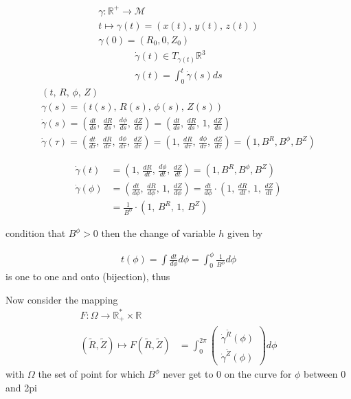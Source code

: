 \begin{align*}
    \gamma : \mathbb{R}^+\rightarrow\mathcal{M}\\
    t \mapsto \gamma(t) = (x(t),\,y(t),\,z(t))\\
    \gamma(0) = (R_0, 0, Z_0)
\end{align*}
\begin{align*}
    \dot{\gamma}(t) \in T_{\gamma(t)}\mathbb{R}^3 \\
    \gamma(t) = \int_0^t\dot{\gamma}(s)ds
\end{align*}
\begin{align*}
    (t,\,R,\,\phi,\,Z)\\
    \gamma(s) = (t(s),\,R(s),\,\phi(s),\,Z(s))\\
    \dot{\gamma}(s) = (\frac{dt}{ds},\,\frac{dR}{ds},\,\frac{d\phi}{ds},\,\frac{dZ}{ds}) = (\frac{dt}{ds},\,\frac{dR}{ds},\,1,\,\frac{dZ}{ds})\\
    \dot{\gamma}(\tau) = (\frac{dt}{d\tau},\,\frac{dR}{d\tau},\,\frac{d\phi}{d\tau},\,\frac{dZ}{d\tau}) = (1,\,\frac{dR}{d\tau},\,\frac{d\phi}{d\tau},\,\frac{dZ}{d\tau}) = (1, B^R, B^\phi, B^Z)
\end{align*}

\begin{align*}
    \dot{\gamma}(t) &= (1,\,\frac{dR}{dt},\,\frac{d\phi}{dt},\,\frac{dZ}{dt}) = (1, B^R, B^\phi, B^Z)\\
    \dot{\gamma}(\phi) &= (\frac{dt}{d\phi},\,\frac{dR}{d\phi},\,1,\,\frac{dZ}{d\phi}) = \frac{dt}{d\phi}\cdot(1,\,\frac{dR}{dt},\,1,\,\frac{dZ}{dt})\\
    &= \frac{1}{B^\phi}\cdot(1,\,B^R,\,1,\,B^Z)
\end{align*}

condition that $B^\phi > 0$  then the change of variable $h$ given by

\begin{align*}
    t(\phi) = \int \frac{dt}{d\phi}d\phi = \int_0^\phi \frac{1}{B^\phi}d\phi
\end{align*}
is one to one and onto (bijection), thus 

Now consider the mapping 
\begin{align*}
    F : \Omega \rightarrow \mathbb{R}_+^*\times\mathbb{R}\\
    (\tilde{R},\tilde{Z}) \mapsto F(\tilde{R},\tilde{Z}) &= \int_0^{2\pi}\begin{pmatrix}
        \dot{\gamma}^{\tilde{R}}(\phi)\\
        \dot{\gamma}^{\tilde{Z}}(\phi)
    \end{pmatrix}d\phi
\end{align*}
with $\Omega$ the set of point for which $B^\phi$ never get to 0 on the curve for $\phi$ between 0 and 2pi



